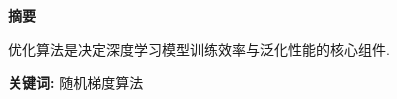 \pagestyle{plain}
\setcounter{page}{1}
\begin{center}
     \bfseries 摘\quad 要
\end{center}

优化算法是决定深度学习模型训练效率与泛化性能的核心组件.

\textbf{关键词:  }随机梯度算法\quad  \quad  \quad  \quad 
\newpage